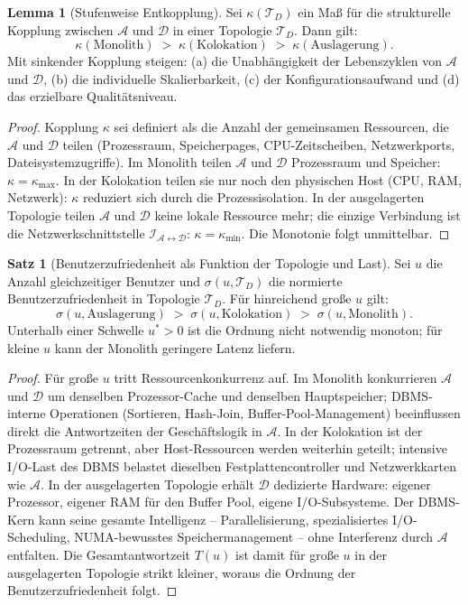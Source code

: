 ﻿\documentclass[a4paper,12pt]{article}
\theoremstyle{definition}
\newtheorem{satz}{Satz}
\newtheorem{lemma}{Lemma}
\begin{document}
\begin{lemma}[Stufenweise Entkopplung]
\label{lem:entkopplung}
Sei $\kappa(\mathcal{T}_D)$ ein Maß für die strukturelle Kopplung zwischen $\mathcal{A}$ und $\mathcal{D}$ in einer Topologie $\mathcal{T}_D$. Dann gilt:
\[
\kappa(\text{Monolith}) \;>\; \kappa(\text{Kolokation}) \;>\; \kappa(\text{Auslagerung}).
\]
Mit sinkender Kopplung steigen: (a) die Unabhängigkeit der Lebenszyklen von $\mathcal{A}$ und $\mathcal{D}$, (b) die individuelle Skalierbarkeit, (c) der Konfigurationsaufwand und (d) das erzielbare Qualitätsniveau.
\end{lemma}

\begin{proof}
Kopplung $\kappa$ sei definiert als die Anzahl der gemeinsamen Ressourcen, die $\mathcal{A}$ und $\mathcal{D}$ teilen (Prozessraum, Speicherpages, CPU-Zeitscheiben, Netzwerkports, Dateisystemzugriffe). Im Monolith teilen $\mathcal{A}$ und $\mathcal{D}$ Prozessraum und Speicher: $\kappa = \kappa_\text{max}$. In der Kolokation teilen sie nur noch den physischen Host (CPU, RAM, Netzwerk): $\kappa$ reduziert sich durch die Prozessisolation. In der ausgelagerten Topologie teilen $\mathcal{A}$ und $\mathcal{D}$ keine lokale Ressource mehr; die einzige Verbindung ist die Netzwerkschnittstelle $\mathcal{I}_{\mathcal{A} \leftrightarrow \mathcal{D}}$: $\kappa = \kappa_\text{min}$. Die Monotonie folgt unmittelbar.
\end{proof}

\begin{satz}[Benutzerzufriedenheit als Funktion der Topologie und Last]
\label{satz:zufriedenheit}
Sei $u$ die Anzahl gleichzeitiger Benutzer und $\sigma(u, \mathcal{T}_D)$ die normierte Benutzerzufriedenheit in Topologie $\mathcal{T}_D$. Für hinreichend große $u$ gilt:
\[
\sigma(u, \text{Auslagerung}) \;>\; \sigma(u, \text{Kolokation}) \;>\; \sigma(u, \text{Monolith}).
\]
Unterhalb einer Schwelle $u^* > 0$ ist die Ordnung nicht notwendig monoton; für kleine $u$ kann der Monolith geringere Latenz liefern.
\end{satz}

\begin{proof}
Für große $u$ tritt Ressourcenkonkurrenz auf. Im Monolith konkurrieren $\mathcal{A}$ und $\mathcal{D}$ um denselben Prozessor-Cache und denselben Hauptspeicher; DBMS-interne Operationen (Sortieren, Hash-Join, Buffer-Pool-Management) beeinflussen direkt die Antwortzeiten der Geschäftslogik in $\mathcal{A}$. In der Kolokation ist der Prozessraum getrennt, aber Host-Ressourcen werden weiterhin geteilt; intensive I/O-Last des DBMS belastet dieselben Festplattencontroller und Netzwerkkarten wie $\mathcal{A}$. In der ausgelagerten Topologie erhält $\mathcal{D}$ dedizierte Hardware: eigener Prozessor, eigener RAM für den Buffer Pool, eigene I/O-Subsysteme. Der DBMS-Kern kann seine gesamte Intelligenz -- Parallelisierung, spezialisiertes I/O-Scheduling, NUMA-bewusstes Speichermanagement -- ohne Interferenz durch $\mathcal{A}$ entfalten. Die Gesamtantwortzeit $T(u)$ ist damit für große $u$ in der ausgelagerten Topologie strikt kleiner, woraus die Ordnung der Benutzerzufriedenheit folgt.
\end{proof}
\end{document}
